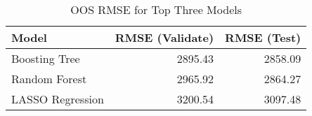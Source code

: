 \begin{table}[ht]
\centering
\caption{OOS RMSE for Top Three Models} 
\label{tab:rmse_test}
\begin{tabular}{lrr}
  \hline
Model & RMSE (Validate) & RMSE (Test) \\ 
  \hline
Boosting Tree & 2895.43 & 2858.09 \\ 
  Random Forest & 2965.92 & 2864.27 \\ 
  LASSO Regression & 3200.54 & 3097.48 \\ 
   \hline
\end{tabular}
\end{table}
